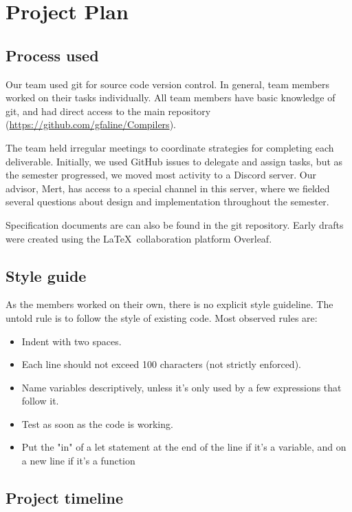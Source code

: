 \section{Project Plan} 

\subsection{Process used}

Our team used git for source code version control. In general, team members worked on
their tasks individually. All team members have basic knowledge of git, and had
direct access to the main repository (\url{https://github.com/gfaline/Compilers}).

The team held irregular meetings to coordinate strategies for completing each
deliverable. Initially, we used GitHub issues to delegate and assign tasks, but as the
semester progressed, we moved most activity to a Discord server. Our advisor, Mert, has
access to a special channel in this server, where we fielded several questions about
design and implementation throughout the semester.

Specification documents are can also be found in the git repository. Early drafts were created using
the \LaTeX \ collaboration platform Overleaf.

\subsection{Style guide}

As the members worked on their own, there is no explicit style guideline. The untold rule is to
follow the style of existing code. Most observed rules are:

\begin{itemize}
\item Indent with two spaces.
\item Each line should not exceed 100 characters (not strictly enforced).
\item Name variables descriptively, unless it's only used by a few expressions that follow it.
\item Test as soon as the code is working.
\item Put the "in" of a let statement at the end of the line if it's a variable, and on a new
      line if it's a function
\end{itemize}

\subsection{Project timeline}

